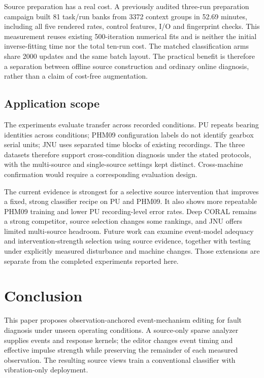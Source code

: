 \documentclass[a4paper,fleqn]{cas-sc}
\begin{document}
Source preparation has a real cost. A previously audited three-run preparation campaign built 81 task/run banks from 3372 context groups in 52.69 minutes, including all five rendered rates, control features, I/O and fingerprint checks. This measurement reuses existing 500-iteration numerical fits and is neither the initial inverse-fitting time nor the total ten-run cost. The matched classification arms share 2000 updates and the same batch layout. The practical benefit is therefore a separation between offline source construction and ordinary online diagnosis, rather than a claim of cost-free augmentation.

\subsection{Application scope}
The experiments evaluate transfer across recorded conditions. PU repeats bearing identities across conditions; PHM09 configuration labels do not identify gearbox serial units; JNU uses separated time blocks of existing recordings. The three datasets therefore support cross-condition diagnosis under the stated protocols, with the multi-source and single-source settings kept distinct. Cross-machine confirmation would require a corresponding evaluation design.

The current evidence is strongest for a selective source intervention that improves a fixed, strong classifier recipe on PU and PHM09. It also shows more repeatable PHM09 training and lower PU recording-level error rates. Deep CORAL remains a strong competitor, source selection changes some rankings, and JNU offers limited multi-source headroom. Future work can examine event-model adequacy and intervention-strength selection using source evidence, together with testing under explicitly measured disturbance and machine changes. Those extensions are separate from the completed experiments reported here.

\section{Conclusion}
This paper proposes observation-anchored event-mechanism editing for fault diagnosis under unseen operating conditions. A source-only sparse analyzer supplies events and response kernels; the editor changes event timing and effective impulse strength while preserving the remainder of each measured observation. The resulting source views train a conventional classifier with vibration-only deployment.
\end{document}
